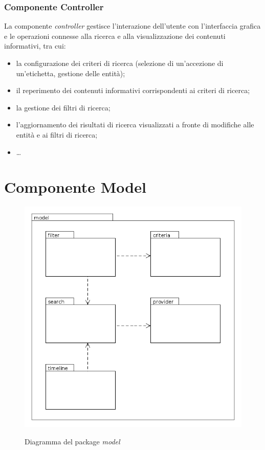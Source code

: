 \documentclass[10pt,a4paper,headinclude,footinclude,hidelinks]{scrreprt} %
\begin{document}
	\subsection{Componente Controller}
	\label{sec:stage:design:mvc:controller}
	La componente \textit{controller} gestisce l'interazione dell'utente con l'interfaccia grafica e le operazioni connesse alla ricerca e alla visualizzazione dei contenuti informativi, tra cui:
	\begin{itemize}
	\item la configurazione dei criteri di ricerca (selezione di un'accezione di un'etichetta, gestione delle entità);
	\item il reperimento dei contenuti informativi corrispondenti ai criteri di ricerca;
	\item la gestione dei filtri di ricerca;
	\item l'aggiornamento dei risultati di ricerca visualizzati a fronte di modifiche alle entità e ai filtri di ricerca;
	\item \ldots
	\end{itemize}

	\chapter{Componente Model}
	\label{ch:stage:design:model}

	\begin{figure}[ht]
		\begin{center}
	    	\includegraphics[width=12cm]{package/model.png}
			\label{gfx:package:model}
			\caption{Diagramma del package \textit{model}}
		\end{center}
	\end{figure}
\end{document}
